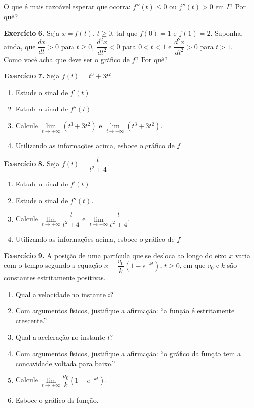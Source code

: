 \documentclass[12pt,a4paper]{article}
\begin{document}
\noindent O que é mais razoável esperar que ocorra: $f''(t) \le 0$ ou $f''(t) > 0$ em $I$? Por quê?

\vspace{0.5cm}
\noindent\textbf{Exercício 6.}
Seja $x = f(t)$, $t \ge 0$, tal que $f(0) = 1$ e $f(1) = 2$. Suponha, ainda, que $\dfrac{dx}{dt} > 0$ para $t \ge 0$, $\dfrac{d^2x}{dt^2} < 0$ para $0 < t < 1$ e $\dfrac{d^2x}{dt^2} > 0$ para $t > 1$. Como você acha que deve ser o gráfico de $f$? Por quê?

\vspace{0.5cm}
\noindent\textbf{Exercício 7.} Seja $f(t) = t^3 + 3t^2$.
\begin{enumerate}
    \renewcommand{\theenumi}{\alph{enumi}}
    \renewcommand{\labelenumi}{\theenumi)}
    \item Estude o sinal de $f'(t)$.
    \item Estude o sinal de $f''(t)$.
    \item Calcule $\lim\limits_{t \to +\infty} (t^3 + 3t^2)$ e $\lim\limits_{t \to -\infty} (t^3 + 3t^2)$.
    \item Utilizando as informações acima, esboce o gráfico de $f$.
\end{enumerate}

\vspace{0.5cm}
\noindent\textbf{Exercício 8.} Seja $f(t) = \dfrac{t}{t^2 + 4}$.
\begin{enumerate}
    \renewcommand{\theenumi}{\alph{enumi}}
    \renewcommand{\labelenumi}{\theenumi)}
    \item Estude o sinal de $f'(t)$.
    \item Estude o sinal de $f''(t)$.
    \item Calcule $\lim\limits_{t \to +\infty} \dfrac{t}{t^2 + 4}$ e $\lim\limits_{t \to -\infty} \dfrac{t}{t^2 + 4}$.
    \item Utilizando as informações acima, esboce o gráfico de $f$.
\end{enumerate}

\vspace{0.5cm}
\noindent\textbf{Exercício 9.} A posição de uma partícula que se desloca ao longo do eixo $x$ varia com o tempo segundo a equação $x = \dfrac{v_0}{k}(1 - e^{-kt})$, $t \ge 0$, em que $v_0$ e $k$ são constantes estritamente positivas.
\begin{enumerate}
    \renewcommand{\theenumi}{\alph{enumi}}
    \renewcommand{\labelenumi}{\theenumi)}
    \item Qual a velocidade no instante $t$?
    \item Com argumentos físicos, justifique a afirmação: ``a função é estritamente crescente.''
    \item Qual a aceleração no instante $t$?
    \item Com argumentos físicos, justifique a afirmação: ``o gráfico da função tem a concavidade voltada para baixo.''
    \item Calcule $\lim\limits_{t \to +\infty} \dfrac{v_0}{k}(1 - e^{-kt})$.
    \item Esboce o gráfico da função.
\end{enumerate}
\end{document}
